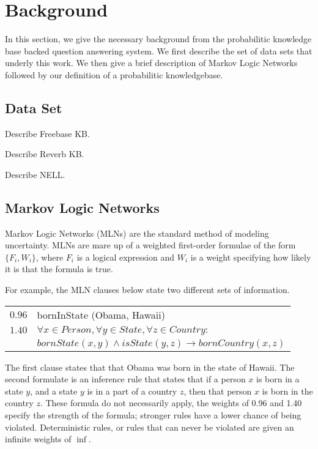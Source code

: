 
\section{Background}

In this section, we give the necessary background from the probabilitic knowledge base backed question answering system.
We first describe the set of data sets that underly this work.
We then give a brief description of Markov Logic Networks followed by our definition of a probabilitic knowledgebase.

\subsection{Data Set}
Describe Freebase KB.

Describe Reverb KB.

Describe NELL.

\subsection{Markov Logic Networks}

Markov Logic Networks (MLNs) are the standard method of modeling uncertainty.
MLNs are mare up of a weighted first-order formulae of the form \(\{F_i, W_i\}\),
where \(F_i\) is a logical expression and \(W_i\) is a weight
specifying how likely it is that the formula is true.

For example, the MLN clauses below state two different sets of information.

\begin{tabular}{l l}
  \(0.96\) & bornInState (Obama, Hawaii) \\
  \(1.40\) & \( \forall x \in Person, \forall y \in State, \forall z \in Country: \) \\
           & \(bornState(x,y) \wedge isState(y,z) \rightarrow bornCountry(x, z)\)
\end{tabular}

The first clause states that that Obama was born in the state of Hawaii.
The second formulate is an inference rule that states that if a person \(x\) is born in a state \(y\), and a state \(y\) is in a part of a country \(z\),
then that person \(x\) is born in the country \(z\).
These formula do not necessarily apply,
the weights of 0.96 and 1.40 specify the strength of the formula; stronger rules have a lower chance of being violated.
Deterministic rules, or rules that can never be violated are given an infinite weights of $\inf$.


